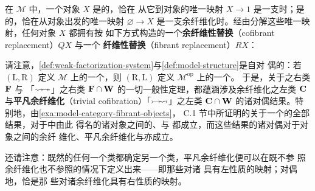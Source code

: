 \begin{definition}\label{def:fibrant-cofibrant}
在\trModelCategory{} $\mathcal{M}$ 中，一个对象 $X$ 是\textbf{\trFibrant}的，恰在%
从它到\trTerminal{}对象的唯一映射 $X\to 1$ 是一支\trFibration{}时；是%
\textbf{\trCofibrant}的，恰在从\trInitial{}对象出发的唯一映射%
$\varnothing\to X$ 是一支余纤维化时。经由分解这些唯一映射，任何对象 $X$ 都拥有按
如下方式构造的一个\textbf{余纤维性替换}（cofibrant replacement）$QX$ 与一个%
\textbf{纤维性替换}（fibrant replacement）$RX$：
\begin{center}
\end{center}
\end{definition}

请注意，\cref{def:weak-factorization-system}与\cref{def:model-structure}是自对
偶的：若 $(\mathrm{L},\mathrm{R})$ 定义 $\mathcal{M}$ 上的一个\trWeakFactorizationSystem，则
$(\mathrm{R},\mathrm{L})$ 定义 $\mathcal{M}^{\mathrm{op}}$ 上的一个\trWeakFactorizationSystem。
于是，关于\trFibration{}之右类 $\mathbf{F}$ 与\textbf{\trTrivialFibration}%
「$\rvTFarrow$」之右类 $\mathbf{F}\cap\mathbf{W}$ 的一切一般性定理，都蕴涵涉及余纤维化之左类
$\mathbf{C}$ 与\textbf{平凡余纤维化}（trivial cofibration）「$\rvTCarrow$」之左类
$\mathbf{C}\cap\mathbf{W}$ 的诸对偶结果。特别地，由\cref{exa:model-category-fibrant-objects}，
C.1 节中所证明的关于一个\trCategoryOfFibrantObjects{}的全部结果，对于\trModelCategory{}中由此
得名的诸\trFibrant{}对象之间的\trFibration、\trTrivialFibration{}与%
\trWeakEquivalence{}都成立，而这些结果的诸对偶对于\trCofibrant{}对象之间的余纤
维化、平凡余纤维化与\trWeakEquivalence{}亦成立。

还请注意：既然\trWeakFactorizationSystem{}的任何一个类都确定另一个类，平凡余纤维化便可以在既不参
照余纤维化也不参照\trWeakEquivalence{}的情况下定义出来——即那些对诸%
\trFibration{}具有左\trLifting{}性质的映射；对偶地，\trTrivialFibration{}恰是那
些对诸余纤维化具有右\trLifting{}性质的映射。

